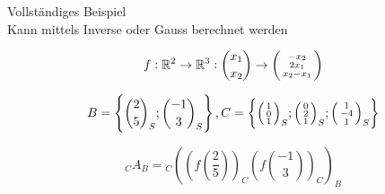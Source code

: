 \begin{KR}{Vollständiges Beispiel} 
    \\Kann mittels Inverse oder Gauss berechnet werden

    $$
    f: \mathbb{R}^{2} \rightarrow \mathbb{R}^{3}:\binom{x_{1}}{x_{2}} \rightarrow\begin{psmallmatrix} -x_{2} \\ 2 x_{1} \\ x_{2}-x_{1} \end{psmallmatrix}
    $$

    $$
    B=\left\{\binom{2}{5}_{S} ;\binom{-1}{3}_{S}\right\}, C=\left\{\begin{psmallmatrix} 1 \\ 0 \\ 1 \end{psmallmatrix}_{S} ;\begin{psmallmatrix} 0 \\ 2 \\ 1 \end{psmallmatrix}_{S} ;\begin{psmallmatrix} 1 \\ -4 \\ 1 \end{psmallmatrix}_{S}\right\}
    $$

    $$
    { }_{C} A_{B}={ }_{C}\left(\left(f\left(\frac{2}{5}\right)\right)_{C}\left(f\binom{-1}{3}\right)_{C}\right)_{B}
    $$

    \vspace{2mm}


    \vspace{2mm}


\end{KR}
